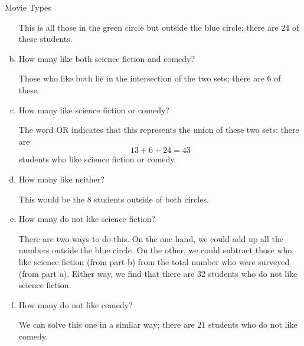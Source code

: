 \begin{example}{Movie Types}
\begin{enumerate}[(a)]
This is all those in the green circle but outside the blue circle; there are $\boxed{24}$ of these students.\\

\item How many like both science fiction and comedy?

Those who like both lie in the intersection of the two sets; there are $\boxed{6}$ of these.\\

\item How many like science fiction or comedy?

The word OR indicates that this represents the union of these two sets: there are \[13+6+24 = \boxed{43}\] students who like science fiction or comedy.\\

\item How many like neither?

This would be the $\boxed{8}$ students outside of both circles.\\

\item How many do not like science fiction?

There are two ways to do this.  On the one hand, we could add up all the numbers outside the blue circle.  On the other, we could subtract those who like science fiction (from part b) from the total number who were surveyed (from part a).  Either way, we find that there are $\boxed{32}$ students who do not like science fiction.\\

\item How many do not like comedy?

We can solve this one in a similar way; there are $\boxed{21}$ students who do not like comedy.
\end{enumerate}
\end{example}

